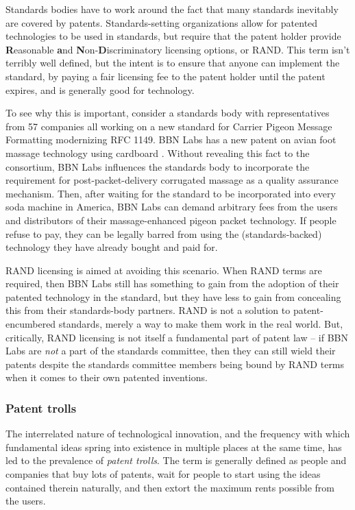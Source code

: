 \documentclass[acmtocl]%
{boviktrans}
\begin{document}
Standards bodies have to work around the fact that many standards
inevitably are covered by patents. Standards-setting organizations
allow for patented technologies to be used in standards, but require
that the patent holder provide {\bf R}easonable {\bf a}nd {\bf
  N}on-{\bf D}iscriminatory licensing options, or RAND. This term
isn't terribly well defined, but the intent is to ensure that anyone
can implement the standard, by paying a fair licensing fee to the
patent holder until the patent expires, and is generally good for
technology.

To see why this is important, consider a standards body with
representatives from 57 companies all working on a new standard for
Carrier Pigeon Message Formatting modernizing RFC 1149. BBN Labs has a
new patent on avian foot massage technology using cardboard
\cite{ebert}. Without revealing this fact to the consortium, BBN Labs
influences the standards body to incorporate the requirement for
post-packet-delivery corrugated massage as a quality assurance
mechanism. Then, after waiting for the standard to be incorporated
into every soda machine in America, BBN Labs can demand arbitrary fees
from the users and distributors of their massage-enhanced pigeon
packet technology. If people refuse to pay, they can be legally barred
from using the (standards-backed) technology they have already bought
and paid for.

RAND licensing is aimed at avoiding this scenario. When
RAND terms are required, then BBN Labs still has something to gain
from the adoption of their patented technology in the standard, but
they have less to gain from concealing this from their standards-body
partners. RAND is not a solution to patent-encumbered standards,
merely a way to make them work in the real world. But, critically,
RAND licensing is not itself a fundamental part of patent law -- if
BBN Labs are {\it not} a part of the standards committee, then they can
still wield their patents despite the standards committee members
being bound by RAND terms when it comes to their own patented
inventions. 

\subsubsection{Patent trolls}

The interrelated nature of technological innovation, and the frequency
with which fundamental ideas spring into existence in multiple places
at the same time, has led to the prevalence of {\it patent trolls}.
The term is generally defined as people and companies that buy lots of
patents, wait for people to start using the ideas contained therein
naturally, and then extort the maximum rents possible from the users.
\end{document}
